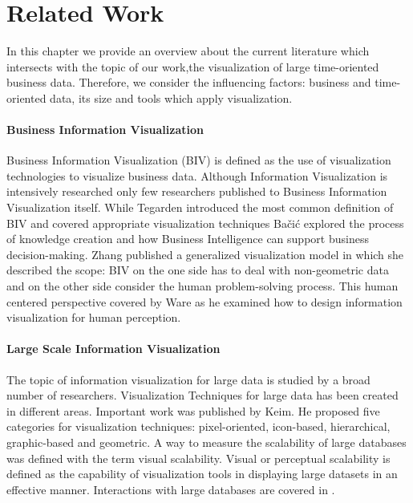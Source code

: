 \chapter{Related Work}
\label{chap:related Work}
In this chapter we provide an overview about the current literature which intersects with the topic of our work,the visualization of large time-oriented business data. Therefore, we consider the influencing factors: business and time-oriented data, its size and tools which apply visualization. 

\subsubsection*{Business Information Visualization} 
Business Information Visualization (BIV) is defined as the use of visualization technologies to visualize business data\cite{Tegarden1999}. Although Information Visualization is intensively researched\cite{Shneiderman2008,Shneiderman2002,Shneiderman1996,Keim2002} only few researchers published to Business Information Visualization itself. While Tegarden\cite{Tegarden1999} introduced the most common definition of BIV and covered appropriate visualization techniques Bačić explored the process of knowledge creation\cite{Bacic2012} and how Business Intelligence can support business decision-making\cite{Bacic,Bacic2012}. Zhang\cite{Zhang,Zhang1998,Zhang2001} published a generalized visualization model in which she described the scope: BIV on the one side has to deal with non-geometric data and on the other side consider the human problem-solving process. This human centered perspective covered by Ware\cite{Ware2012a} as he examined how to design information visualization for human perception.

\subsubsection*{Large Scale Information Visualization}
The topic of information visualization for large data is studied by a broad number of researchers. Visualization Techniques for large data has been created in different areas\cite{Krzywinski2009,Luo2012}. Important work was published by Keim\cite{Keim1996}. He proposed five categories for visualization techniques: pixel-oriented\cite{Keim1995,Stein2013,Keim2000,keim1996pixel,Keim2001, Keim2005,Keim2008VisualChallenges}, icon-based\cite{Chung2014,Borgo2013,Fanea2005}, hierarchical\cite{Yang2003,Shneiderman1992,LeBlanc1990}, graphic-based and geometric\cite{Noirhomme-Fraiture2002}.
A way to measure the scalability of large databases was defined with the term visual scalability. Visual or perceptual scalability is defined as the capability of visualization tools in displaying large datasets in an effective manner\cite{Eick2002}.
Interactions with large databases are covered in \cite{Fisher2012,Buono,Jerding1998,mackinlay1991perspective,Keim2005}. 

